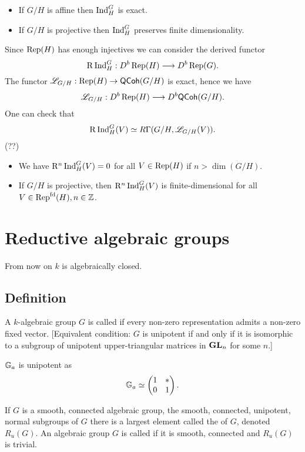 \begin{consequences} \leavevmode
\begin{itemize}
	\item If $G /H$ is affine then $\operatorname{Ind}_{H}^{G}$ is exact.
	\item If $G /H$ is projective then $\operatorname{Ind}_{H}^{G}$ preserves finite dimensionality.
\end{itemize}
\end{consequences}

Since $\operatorname{Rep}(H)$ has enough injectives we can consider the derived functor
\[
	\RD\Ind_H^{G}:D^{b}\Rep(H)\to D^{b}\Rep(G).
\]
The functor $\CL_{G /H}:\Rep(H)\to \cat{QCoh}(G /H)$ is exact, hence we have 
\[
	\CL_{G /H}:D^{b}\Rep(H)\to D^{b}\cat{QCoh}(G /H).
\]
One can check that
\[
\mathrm{R}\operatorname{Ind}_H^{G}(V) \simeq R\Gamma(G /H, \mathscr{L}_{G /H}(V)).
\] 
(??)

\begin{consequences} \leavevmode
\begin{itemize}
	\item We have $\mathrm{R}^{n}\operatorname{Ind}_H^{G}(V)=0$ for all $V\in \operatorname{Rep}(H)$ if $n>\dim(G /H)$.
	\item If $G /H$ is projective, then $\mathrm{R}^{n}\operatorname{Ind}_H^{G}(V)$ is finite-dimensional for all $V\in \operatorname{Rep}^{\text{fd}}(H), n\in \mathbb Z$.
\end{itemize}
\end{consequences}

\newpage

\section{Reductive algebraic groups}
From now on $k$ is algebraically closed.

\subsection{Definition}
A $k$-algebraic group $G$ is called  if every non-zero representation admits a non-zero fixed vector. [Equivalent condition: $G$ is unipotent if and only if it is isomorphic to a subgroup of unipotent upper-triangular matrices in $\mathbf{GL}_n$ for some $n$.]
\begin{example}
	$\mathbb{G}_a$ is unipotent as
	\[
		\mathbb{G}_a \simeq \begin{pmatrix} 1 & * \\ 0 & 1 \end{pmatrix} .
	\] 
\end{example}
If $G$ is a smooth, connected algebraic group, the smooth, connected, unipotent, normal subgroups of $G$ there is a largest element called the  of $G$, denoted $R_u(G)$. An algebraic group $G$ is called  if it is smooth, connected and $R_u(G)$ is trivial. 

